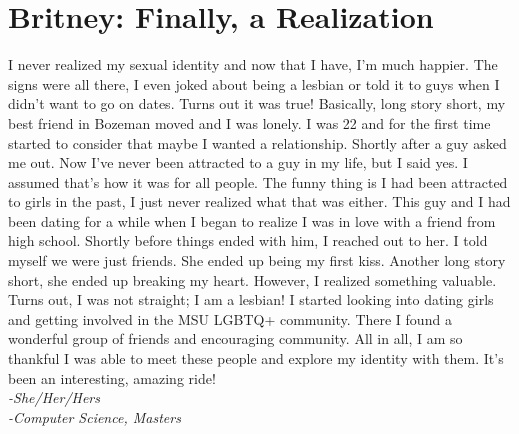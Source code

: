 \section*{Britney: Finally, a Realization}
I never realized my sexual identity and now that I have, I’m much happier. 
The signs were all there, I even joked about being a lesbian or told it to 
guys when I didn’t want to go on dates. Turns out it was true! Basically, long 
story short, my best friend in Bozeman moved and I was lonely. I was 22 and for
the first time started to consider that maybe I wanted a relationship. Shortly 
after a guy asked me out. Now I’ve never been attracted to a guy in my life, 
but I said yes. I assumed that’s how it was for all people. The funny thing is 
I had been attracted to girls in the past, I just never realized what that was 
either. This guy and I had been dating for a while when I began to realize I 
was in love with a friend from high school. Shortly before things ended with 
him, I reached out to her. I told myself we were just friends. She ended up 
being my first kiss. Another long story short, she ended up breaking my heart. 
However, I realized something valuable. Turns out, I was not straight; I am a 
lesbian! I started looking into dating girls and getting involved in the MSU 
LGBTQ+ community. There I found a wonderful group of friends and encouraging 
community. All in all, I am so thankful I was able to meet these people and 
explore my identity with them. It’s been an interesting, amazing ride! \\
\textit{-She/Her/Hers} \\
\textit{-Computer Science, Masters}
